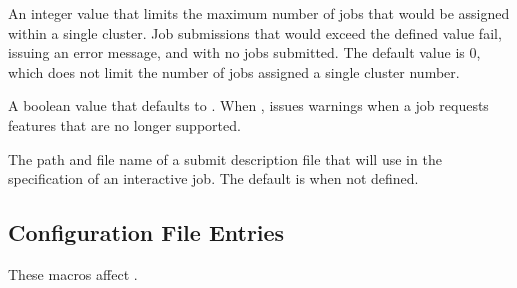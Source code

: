 \begin{description}
\label{param:SubmitMaxProcsInCluster}
\item[\Macro{SUBMIT\_MAX\_PROCS\_IN\_CLUSTER}]
  An integer value that limits the maximum number of jobs that would
  be assigned within a single cluster.  Job submissions that would exceed
  the defined value fail, issuing an error message, and with no jobs
  submitted.
  The default value is 0, which does not limit the number of jobs
  assigned a single cluster number.

\label{param:EnableDeprecationWarnings}
\item[\Macro{ENABLE\_DEPRECATION\_WARNINGS}]
  A boolean value that defaults to .
  When ,  issues warnings when a job requests
  features that are no longer supported. 

\label{param:InteractiveSubmitFile}
\item[\Macro{INTERACTIVE\_SUBMIT\_FILE}]
  The path and file name of a submit description file that 
  will use in the specification of an interactive job.
  The default is 
  when not defined.

\end{description}

\subsection{\label{sec:Preen-Config-File-Entries}
Configuration File Entries}

These macros affect .

